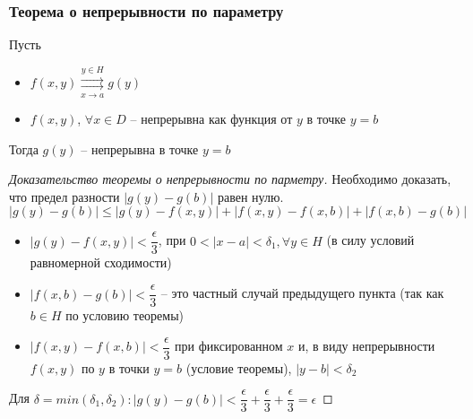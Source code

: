 \subsubsection{Теорема о непрерывности по параметру}
\begin{theorem*}
    Пусть
    \begin{itemize}
        \item $f(x, y) \overset{y \in H}{\underset{x \to a}{\rightrightarrows}} g(y)$
        \item $f(x, y)$, $\forall x \in D$ -- непрерывна как функция от $y$ в точке $y = b$
    \end{itemize}
    Тогда $g(y)$ -- непрерывна в точке $y = b$
\end{theorem*}
\begin{proof}[Доказательство теоремы о непрерывности по парметру]
    Необходимо доказать, что предел разности $|g(y) - g(b)|$ равен нулю. \\ 
    $|g(y) - g(b)| \leqslant |g(y) - f(x, y)| + |f(x, y) - f(x, b)| + |f(x, b) - g(b)|$
    \begin{itemize}
        \item $|g(y) - f(x, y)| < \dfrac{\epsilon}{3}$, при $0 < |x - a| < \delta_1, \forall y \in H$ 
        (в силу условий равномерной сходимости)
        \item $|f(x, b) - g(b)| < \dfrac{\epsilon}{3}$ -- это частный случай предыдущего 
        пункта (так как $b \in H$ по условию теоремы)
        \item $|f(x, y) - f(x, b)| < \dfrac{\epsilon}{3}$ при фиксированном $x$ и, в виду непрерывности
        $f(x, y)$ по $y$ в точки $y = b$ (условие теоремы), $|y - b| < \delta_2$
    \end{itemize}
    Для $\delta = min(\delta_1, \delta_2): |g(y) - g(b)| < \dfrac{\epsilon}{3} + 
    \dfrac{\epsilon}{3} +  \dfrac{\epsilon}{3} = \epsilon$
\end{proof}

